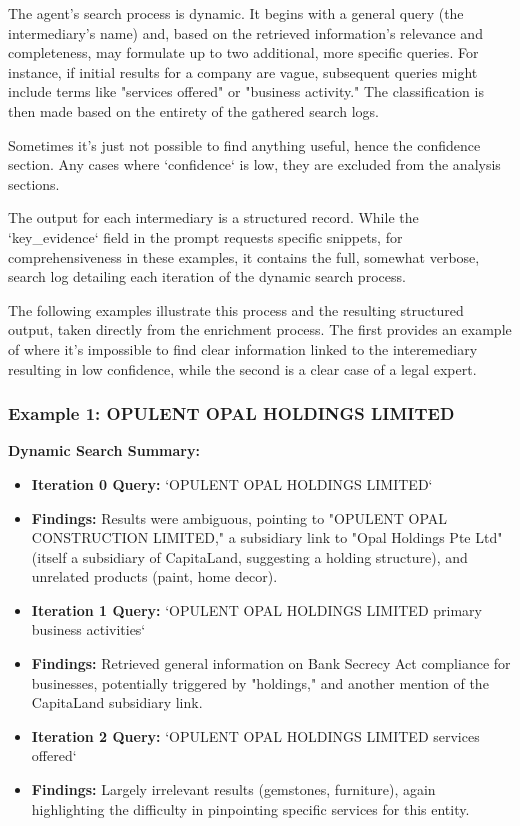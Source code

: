 The agent's search process is dynamic. It begins with a general query (the intermediary's name) and, based on the retrieved information's relevance and completeness, may formulate up to two additional, more specific queries. For instance, if initial results for a company are vague, subsequent queries might include terms like "services offered" or "business activity." The classification is then made based on the entirety of the gathered search logs.

Sometimes it's just not possible to find anything useful, hence the confidence section. Any cases where `confidence` is low, they are excluded from the analysis sections.

The output for each intermediary is a structured record. While the `key\_evidence` field in the prompt requests specific snippets, for comprehensiveness in these examples, it contains the full, somewhat verbose, search log detailing each iteration of the dynamic search process.

The following examples illustrate this process and the resulting structured output, taken directly from the enrichment process. The first provides an example of where it's impossible to find clear information linked to the interemediary resulting in low confidence, while the second is a clear case of a legal expert.

\subsubsection*{Example 1: OPULENT OPAL HOLDINGS LIMITED}
\textbf{Dynamic Search Summary:}
\begin{itemize}
    \item \textbf{Iteration 0 Query:} `OPULENT OPAL HOLDINGS LIMITED`
    \item \textbf{Findings:} Results were ambiguous, pointing to "OPULENT OPAL CONSTRUCTION LIMITED," a subsidiary link to "Opal Holdings Pte Ltd" (itself a subsidiary of CapitaLand, suggesting a holding structure), and unrelated products (paint, home decor).
    \item \textbf{Iteration 1 Query:} `OPULENT OPAL HOLDINGS LIMITED primary business activities`
    \item \textbf{Findings:} Retrieved general information on Bank Secrecy Act compliance for businesses, potentially triggered by "holdings," and another mention of the CapitaLand subsidiary link.
    \item \textbf{Iteration 2 Query:} `OPULENT OPAL HOLDINGS LIMITED services offered`
    \item \textbf{Findings:} Largely irrelevant results (gemstones, furniture), again highlighting the difficulty in pinpointing specific services for this entity.
\end{itemize}

